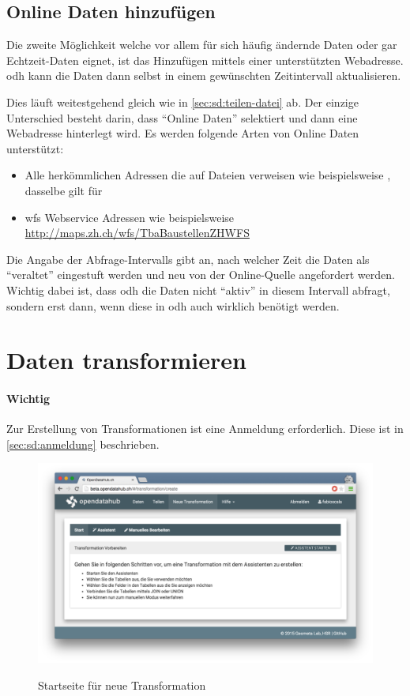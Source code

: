 \subsection{Online Daten hinzufügen}

Die zweite Möglichkeit welche vor allem für sich häufig ändernde Daten oder gar Echtzeit-Daten eignet, ist das Hinzufügen mittels einer unterstützten Webadresse. \acl{odh} kann die Daten dann selbst in einem gewünschten Zeitintervall aktualisieren.

Dies läuft weitestgehend gleich wie in \cref{sec:sd:teilen-datei} ab. Der einzige Unterschied besteht darin, dass ``Online Daten'' selektiert und dann eine Webadresse hinterlegt wird. Es werden folgende Arten von Online Daten unterstützt:

\begin{itemize}
\item Alle herkömmlichen Adressen die auf Dateien verweisen wie beispielsweise , dasselbe gilt für 
\item \gls{wfs} Webservice Adressen wie beispielsweise \url{http://maps.zh.ch/wfs/TbaBaustellenZHWFS}
\end{itemize}

Die Angabe der Abfrage-Intervalls gibt an, nach welcher Zeit die Daten als ``veraltet'' eingestuft werden und neu von der Online-Quelle angefordert werden. Wichtig dabei ist, dass \acl{odh} die Daten nicht ``aktiv'' in diesem Intervall abfragt, sondern erst dann, wenn diese in \acl{odh} auch wirklich benötigt werden.

\section{Daten transformieren}
\paragraph{Wichtig} Zur Erstellung von Transformationen ist eine Anmeldung erforderlich. Diese ist in \vref{sec:sd:anmeldung} beschrieben.

\begin{figure}[H]
	\centering
	\includegraphics[width=\linewidth]{fig/screenshot-neue-transformation}
	\label{fig:sd:screenshot-neue-transformation}
	\caption{Startseite für neue Transformation}
\end{figure}

